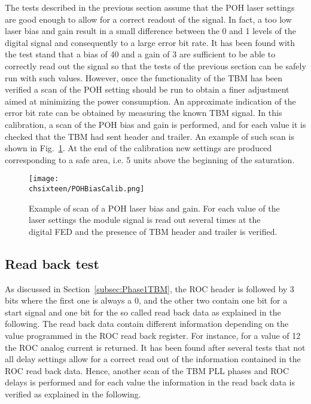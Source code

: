 The tests described in the previous section assume that the POH laser settings are good enough to allow for a correct readout of the signal.
In fact, a too low laser bias and gain result in a small difference between the 0 and 1 levels of the digital signal and consequently to a large error bit rate.
It has been found with the test stand that a bias of 40 and a gain of 3 are sufficient to be able to correctly read out the signal so that the tests of the previous section can be safely run with such values.
However, once the functionality of the TBM has been verified a scan of the POH setting should be run to obtain a finer adjustment aimed at minimizing the power consumption.
An approximate indication of the error bit rate can be obtained by measuring the known TBM signal.
In this calibration, a scan of the POH bias and gain is performed, and for each value it is checked that the TBM had sent header and trailer. An example of such scan is shown in Fig.~\ref{fig:POHBiasCalib}.
At the end of the calibration new settings are produced corresponding to a safe area, i.e. 5 units above the beginning of the saturation.

\begin{figure}[!htb]
 \begin{center}
  \texttt{[image: \\chsixteen/POHBiasCalib.png]}
 \end{center}
 \caption{Example of scan of a POH laser bias and gain. For each value of the laser settings the module signal is read out several times at the digital FED and the presence of TBM header and trailer is verified.}
 \label{fig:POHBiasCalib}
\end{figure} 

\subsection{Read back test}

As discussed in Section~\ref{subsec:Phase1TBM}, the ROC header is followed by 3 bits where the first one is always a 0,
and the other two contain one bit for a start signal and one bit for the so called read back data as explained in the following.
The read back data contain different information depending on the value programmed in the ROC read back register. For instance, for a value of 12 the ROC analog current is returned.
It has been found after several tests that not all delay settings allow for a correct read out of the information contained in the ROC read back data.
Hence, another scan of the TBM PLL phases and ROC delays is performed and for each value the information in the read back data is verified as explained in the following.

